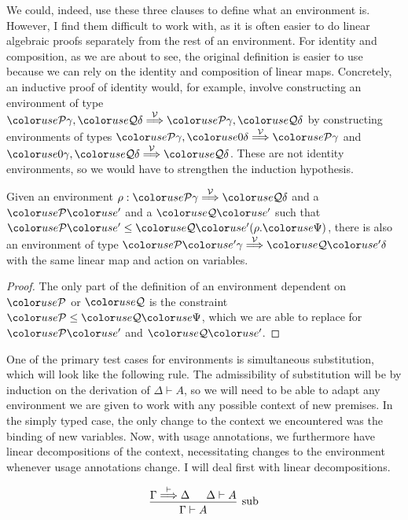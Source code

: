 We could, indeed, use these three clauses to define what an environment is.
However, I find them difficult to work with, as it is often easier to do
linear algebraic proofs separately from the rest of an environment.
For identity and composition, as we are about to see, the original definition
is easier to use because we can rely on the identity and composition of linear
maps.
Concretely, an inductive proof of identity would, for example, involve
constructing an environment of type
$\grP\gamma, \grQ\delta \env\V \grP\gamma, \grQ\delta$ by constructing
environments of types $\grP\gamma, \gr0\delta \env\V \grP\gamma$ and
$\gr0\gamma, \grQ\delta \env\V \grQ\delta$.
These are not identity environments, so we would have to strengthen the
induction hypothesis.

\begin{lemma}\label{thm:env-resize}
  Given an environment $\rho : \grP\gamma \env\V \grQ\delta$ and a $\grPprime$
  and a $\grQprime$ such that $\grPprime \leq \grQprime\plr{\rho.\gr\Psi}$,
  there is also an environment of type $\grPprime\gamma \env\V \grQprime\delta$
  with the same linear map and action on variables.
\end{lemma}
\begin{proof}
  The only part of the definition of an environment dependent on $\grP$ or
  $\grQ$ is the constraint $\grP \leq \grQ\gr\Psi$, which we are able to
  replace for $\grPprime$ and $\grQprime$.
\end{proof}

One of the primary test cases for environments is simultaneous substitution,
which will look like the following rule.
The admissibility of substitution will be by induction on the derivation of
$\Delta \vdash A$, so we will need to be able to adapt any environment we are
given to work with any possible context of new premises.
In the simply typed case, the only change to the context we encountered was the
binding of new variables.
Now, with usage annotations, we furthermore have linear decompositions of the
context, necessitating changes to the environment whenever usage annotations
change.
I will deal first with linear decompositions.

\begin{displaymath}
  \begin{prooftree}
    \hypo{\Gamma \env{\vdash} \Delta}
    \hypo{\Delta \vdash A}
    \infer2[sub]{\Gamma \vdash A}
  \end{prooftree}
\end{displaymath}

